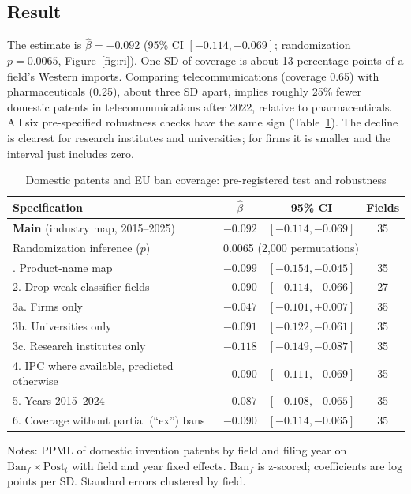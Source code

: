 \documentclass[11pt,a4paper]{article}
\begin{document}
\subsection{Result}

The estimate is $\hat\beta = -0.092$ (95\% CI $[-0.114, -0.069]$; randomization $p=0.0065$, Figure~\ref{fig:ri}).
One SD of coverage is about 13 percentage points of a field's Western imports. Comparing telecommunications
(coverage 0.65) with pharmaceuticals (0.25), about three SD apart, implies roughly 25\% fewer domestic patents in
telecommunications after 2022, relative to pharmaceuticals. All six pre-specified robustness checks have the same
sign (Table~\ref{tab:main}). The decline is clearest for research institutes and universities; for firms it is
smaller and the interval just includes zero.

\begin{table}[ht]
\centering
\begin{threeparttable}
\caption{Domestic patents and EU ban coverage: pre-registered test and robustness}\label{tab:main}
\small
\begin{tabular}{lccc}
\toprule
Specification & $\hat\beta$ & 95\% CI & Fields \\
\midrule
\textbf{Main} (industry map, 2015--2025) & $\mathbf{-0.092}$ & $[-0.114, -0.069]$ & 35 \\
\quad Randomization inference ($p$) & \multicolumn{3}{l}{0.0065 (2,000 permutations)} \\
\addlinespace
1. Product-name map & $-0.099$ & $[-0.154, -0.045]$ & 35 \\
2. Drop weak classifier fields & $-0.090$ & $[-0.114, -0.066]$ & 27 \\
3a. Firms only & $-0.047$ & $[-0.101, +0.007]$ & 35 \\
3b. Universities only & $-0.091$ & $[-0.122, -0.061]$ & 35 \\
3c. Research institutes only & $-0.118$ & $[-0.149, -0.087]$ & 35 \\
4. IPC where available, predicted otherwise & $-0.090$ & $[-0.111, -0.069]$ & 35 \\
5. Years 2015--2024 & $-0.087$ & $[-0.108, -0.065]$ & 35 \\
6. Coverage without partial (``ex'') bans & $-0.090$ & $[-0.114, -0.065]$ & 35 \\
\bottomrule
\end{tabular}
\begin{tablenotes}\footnotesize
\item Notes: PPML of domestic invention patents by field and filing year on $\text{Ban}_f \times \text{Post}_t$
with field and year fixed effects. $\text{Ban}_f$ is z-scored; coefficients are log points per SD. Standard
errors clustered by field.
\end{tablenotes}
\end{threeparttable}
\end{table}
\end{document}
